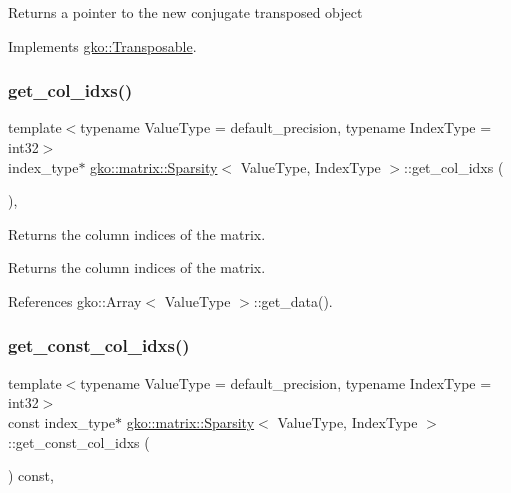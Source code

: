 \begin{DoxyReturn}{Returns}
a pointer to the new conjugate transposed object 
\end{DoxyReturn}


Implements \hyperlink{classgko_1_1Transposable_ab41b669288740cf2a6f7bf76e875b077}{gko\+::\+Transposable}.

\mbox{\label{classgko_1_1matrix_1_1Sparsity_a4ea6a0fd1cdd173d360f64efd6a8eaa9}} 
\subsubsection{\texorpdfstring{get\+\_\+col\+\_\+idxs()}{get\_col\_idxs()}}
{\footnotesize\ttfamily template$<$typename Value\+Type  = default\+\_\+precision, typename Index\+Type  = int32$>$ \\
index\+\_\+type$\ast$ \hyperlink{classgko_1_1matrix_1_1Sparsity}{gko\+::matrix\+::\+Sparsity}$<$ Value\+Type, Index\+Type $>$\+::get\+\_\+col\+\_\+idxs (\begin{DoxyParamCaption}{ }\end{DoxyParamCaption})\hspace{0.3cm}{\ttfamily [inline]}, {\ttfamily [noexcept]}}



Returns the column indices of the matrix. 

\begin{DoxyReturn}{Returns}
the column indices of the matrix. 
\end{DoxyReturn}


References gko\+::\+Array$<$ Value\+Type $>$\+::get\+\_\+data().

\mbox{\label{classgko_1_1matrix_1_1Sparsity_af17ddb05d2e48bc1b8d0b169602c3f9c}} 
\subsubsection{\texorpdfstring{get\+\_\+const\+\_\+col\+\_\+idxs()}{get\_const\_col\_idxs()}}
{\footnotesize\ttfamily template$<$typename Value\+Type  = default\+\_\+precision, typename Index\+Type  = int32$>$ \\
const index\+\_\+type$\ast$ \hyperlink{classgko_1_1matrix_1_1Sparsity}{gko\+::matrix\+::\+Sparsity}$<$ Value\+Type, Index\+Type $>$\+::get\+\_\+const\+\_\+col\+\_\+idxs (\begin{DoxyParamCaption}{ }\end{DoxyParamCaption}) const\hspace{0.3cm}{\ttfamily [inline]}, {\ttfamily [noexcept]}}



